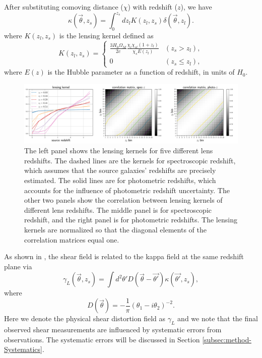 \documentclass[twocolumn]{aastex62}
\begin{document}
After substituting comoving distance ($\chi$) with redshift ($z$), we have
\begin{equation}\label{eq-delta2kappa}
\kappa(\vec{\theta},z_s)=\int_0^{z_s} dz_l K(z_l,z_s)\delta(\vec{\theta},z_l).
\end{equation}
where $K(z_l,z_s)$ is the lensing kernel defined as
\begin{equation}
K(z_l,z_s) =
\begin{cases}
\frac{3H_0\Omega_M}{2 c} \frac{\chi_l \chi_{sl} (1+z_l)}{\chi_{s} E\left(z_l\right)} & (z_s>z_l),\\
0&(z_s \leq z_l),
\end{cases}
\end{equation}
where $E(z)$ is the Hubble parameter as a function of redshift, in units of $H_0$.

\begin{figure}[!t]
 \centering
 \includegraphics[width=1.\textwidth]{lensing_kernel.pdf}
 \caption{The left panel shows the lensing kernels for five different lens
         redshifts. The dashed lines are the kernels for spectroscopic redshift,
         which assumes that the source galaxies' redshifts are precisely
         estimated. The solid lines are for photometric redshifts, which
         accounts for the influence of photometric redshift uncertainty. The
         other two panels show the correlation between lensing kernels of
         different lens redshifts. The middle panel is for spectroscopic
         redshift, and the right panel is for photometric redshifts. The
         lensing kernels are normalized so that the diagonal elements of the
         correlation matrices equal one.
        }\label{fig-corlensKer}
\end{figure}

As shown in \citet{massMap-KS1993}, the shear field is related to the kappa
field at the same redshift plane via
\begin{equation}\label{eq-kappa2gamma}
\gamma_L(\vec{\theta},z_s) = \int  d^2 \theta' D(\vec{\theta}-\vec{\theta'}) \kappa(\vec{\theta'},z_s),
\end{equation}
where
\begin{equation}
D(\vec{\theta})=-\frac{1}{\pi}(\theta_1-i\theta_2)^{-2}.
\end{equation}
Here we denote the physical shear distortion field as $\gamma_L$ and we note
that the final observed shear measurements are influenced by systematic errors
from observations. The systematic errors will be discussed in Section
\ref{subsec:method-Systematics}.
\end{document}
